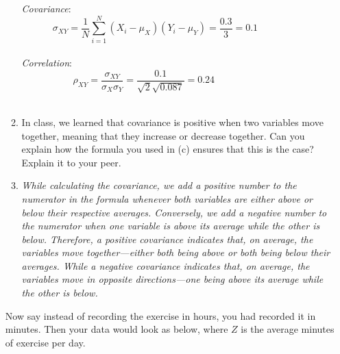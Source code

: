 \documentclass{./../../Latex/handout}
\begin{document}
\begin{enumerate}
\begin{enumerate}
\textit{Covariance}:
$$ \sigma_{XY} = \frac{1}{N}\sum_{i=1}^N (X_i-\mu_X)(Y_i-\mu_Y) = \frac{0.3}{3} = 0.1  \hspace{2cm} $$ \\
\textit{Correlation}:
$$ \rho_{XY} = \frac{ \sigma_{XY}}{\sigma_X \sigma_Y}  = \frac{0.1}{\sqrt{2} \sqrt{0.087}}=0.24 \hspace{3cm} $$ \\
\item In class, we learned that covariance is positive when two variables move together, meaning that they increase or decrease together. Can you explain how the formula you used in (c) ensures that this is the case? Explain it to your peer.
\item[] \textit{While calculating the covariance, we add a positive number to the numerator in the formula whenever both variables are either above or below their respective averages. Conversely, we add a negative number to the numerator when one variable is above its average while the other is below. Therefore, a positive covariance indicates that, on average, the variables move together—either both being above or both being below their averages. While a negative covariance indicates that, on average, the variables move in opposite directions—one being above its average while the other is below.}
\end{enumerate}

Now say instead of recording the exercise in hours, you had recorded it in minutes. Then your data would look as below, where $Z$ is the average minutes of exercise per day. \\


\end{enumerate}
\end{document}
